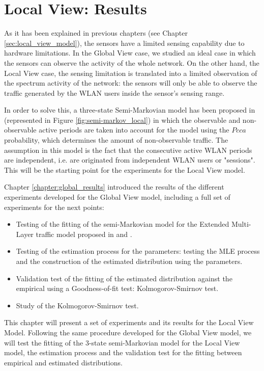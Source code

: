 \chapter{Local View: Results} \label{chapter:local_results}
As it has been explained in previous chapters (see Chapter \ref{sec:local_view_model}), the sensors have a limited sensing capability due to hardware limitations. In the Global View case, we studied an ideal case in which the sensors can observe the activity of the whole network. On the other hand, the Local View case, the sensing limitation is translated into a limited observation of the spectrum activity of the network: the sensors will only be able to observe the traffic generated by the \acs{WLAN} users inside the sensor's sensing range.

In order to solve this, a three-state Semi-Markovian model has been proposed in \cite{marcello} (represented in Figure \ref{fig:semi-markov_local}) in which the observable and non-observable active periods are taken into account for the model using the $Pcca$ probability, which determines the amount of non-observable traffic. The assumption in this model is the fact that the consecutive active \acs{WLAN} periods are independent, i.e. are originated from independent \acs{WLAN} users or "sessions". This will be the starting point for the experiments for the Local View model.

Chapter \ref{chapter:global_results} introduced the results of the different experiments developed for the Global View model, including a full set of experiments for the next points:

\begin{itemize}
	\item Testing of the fitting of the semi-Markovian model for the Extended Multi-Layer traffic model proposed in \cite{Campus-WLAN} and \cite{marcello}.
	\item Testing of the estimation process for the parameters: testing the MLE process and the construction of the estimated distribution using the parameters.
	\item Validation test of the fitting of the estimated distribution against the empirical using a Goodness-of-fit test: Kolmogorov-Smirnov test.
	\item Study of the Kolmogorov-Smirnov test.
\end{itemize}

This chapter will present a set of experiments and its results for the Local View Model. Following the same procedure developed for the Global View model, we will test the fitting of the 3-state semi-Markovian model for the Local View model, the estimation process and the validation test for the fitting between empirical and estimated distributions.